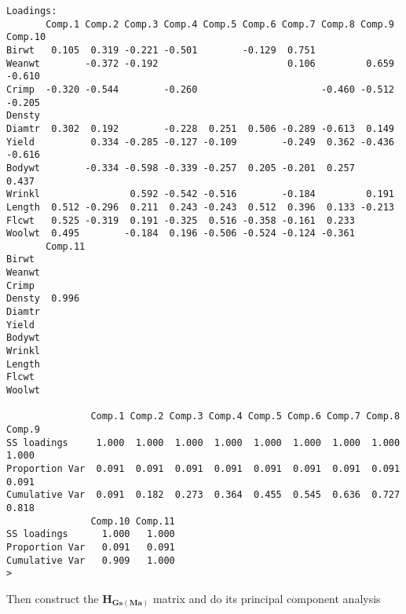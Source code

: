\documentclass[titlepage]{article}  %
\begin{document}
\begin{verbatim}
Loadings:
       Comp.1 Comp.2 Comp.3 Comp.4 Comp.5 Comp.6 Comp.7 Comp.8 Comp.9 Comp.10
Birwt   0.105  0.319 -0.221 -0.501        -0.129  0.751                      
Weanwt        -0.372 -0.192                       0.106         0.659 -0.610 
Crimp  -0.320 -0.544        -0.260                      -0.460 -0.512 -0.205 
Densty                                                                       
Diamtr  0.302  0.192        -0.228  0.251  0.506 -0.289 -0.613  0.149        
Yield          0.334 -0.285 -0.127 -0.109        -0.249  0.362 -0.436 -0.616 
Bodywt        -0.334 -0.598 -0.339 -0.257  0.205 -0.201  0.257         0.437 
Wrinkl                0.592 -0.542 -0.516        -0.184         0.191        
Length  0.512 -0.296  0.211  0.243 -0.243  0.512  0.396  0.133 -0.213        
Flcwt   0.525 -0.319  0.191 -0.325  0.516 -0.358 -0.161  0.233               
Woolwt  0.495        -0.184  0.196 -0.506 -0.524 -0.124 -0.361               
       Comp.11
Birwt         
Weanwt        
Crimp         
Densty  0.996 
Diamtr        
Yield         
Bodywt        
Wrinkl        
Length        
Flcwt         
Woolwt        

               Comp.1 Comp.2 Comp.3 Comp.4 Comp.5 Comp.6 Comp.7 Comp.8 Comp.9
SS loadings     1.000  1.000  1.000  1.000  1.000  1.000  1.000  1.000  1.000
Proportion Var  0.091  0.091  0.091  0.091  0.091  0.091  0.091  0.091  0.091
Cumulative Var  0.091  0.182  0.273  0.364  0.455  0.545  0.636  0.727  0.818
               Comp.10 Comp.11
SS loadings      1.000   1.000
Proportion Var   0.091   0.091
Cumulative Var   0.909   1.000
> 
\end{verbatim}

Then construct the $\bm{H_{Gs(Ma)}}$ matrix and do its principal component analysis
\end{document}
